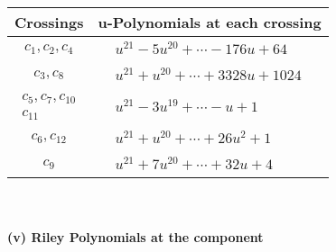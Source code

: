 \documentclass[1p]{elsarticle_modified}
\theoremstyle{definition}
\begin{document}
\begin{tabular}{m{50pt}|m{274pt}}
Crossings & \hspace{64pt}u-Polynomials at each crossing \\
\hline $$\begin{aligned}c_{1},c_{2},c_{4}\end{aligned}$$&$\begin{aligned}
&u^{21}-5 u^{20}+\cdots-176 u+64
\end{aligned}$\\
\hline $$\begin{aligned}c_{3},c_{8}\end{aligned}$$&$\begin{aligned}
&u^{21}+u^{20}+\cdots+3328 u+1024
\end{aligned}$\\
\hline $$\begin{aligned}c_{5},c_{7},c_{10}\\c_{11}\end{aligned}$$&$\begin{aligned}
&u^{21}-3 u^{19}+\cdots- u+1
\end{aligned}$\\
\hline $$\begin{aligned}c_{6},c_{12}\end{aligned}$$&$\begin{aligned}
&u^{21}+u^{20}+\cdots+26 u^2+1
\end{aligned}$\\
\hline $$\begin{aligned}c_{9}\end{aligned}$$&$\begin{aligned}
&u^{21}+7 u^{20}+\cdots+32 u+4
\end{aligned}$\\
\hline
\end{tabular}\\~\\
\newpage\renewcommand{\arraystretch}{1}
\flushleft \textbf{(v) Riley Polynomials at the component}\newline \\
\end{document}

